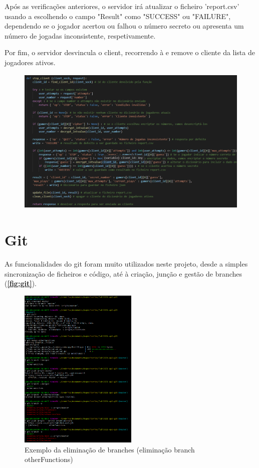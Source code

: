 \documentclass{report}
\begin{document}
Após as verificações anteriores, o servidor irá atualizar o ficheiro 'report.csv' usando a  escolhendo o campo "Result" como "SUCCESS" ou "FAILURE", dependendo se o jogador acertou ou falhou o número secreto ou apresenta um número de jogadas inconsistente, respetivamente.

Por fim, o servidor desvincula o client, recorrendo à  e remove o cliente da lista de jogadores ativos.

\begin{figure}[!h]
\center
\includegraphics[height = 200pt]{img/stopclient.png}
\end{figure}

\section{Git}
\label{sec:git}
As funcionalidades do git foram muito utilizados neste projeto, desde a simples sincronização de ficheiros e código, até à criação, junção e gestão de branches (\textbf{\autoref{fig:git}}). 
\cite{git}

\begin{figure}[!h]
\center 
\includegraphics[height=220pt]{img/otherFunctions_Branch_deletion.png}
\caption{Exemplo da eliminação de branches (eliminação branch otherFunctions)}
\label{fig:git}
\end{figure}
\end{document}
